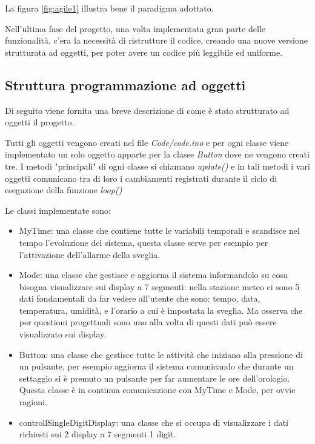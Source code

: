 \documentclass[paper=a4, fontsize=10pt]{scrartcl}
\begin{document}
La figura \ref{fig:agile1}
illustra bene il paradigma adottato.


Nell'ultima fase del progetto, una volta implementata gran parte delle funzionalità, c'era la necessità di ristrutture il codice, creando una nuove versione strutturata ad oggetti, per poter avere un codice più leggibile ed uniforme.
\subsection{Struttura programmazione ad oggetti}
Di seguito viene fornita una breve descrizione di come è stato strutturato ad oggetti il progetto.

Tutti gli oggetti vengono creati nel file \textit{Code/code.ino} e per ogni classe viene implementato un solo oggetto apparte per la classe \textit{Button} dove ne vengono creati tre. I metodi "principali" di ogni classe si chiamano \textit{update()} e in tali metodi i vari oggetti comunicano tra di loro i cambiamenti registrati durante il ciclo di eseguzione della funzione \textit{loop()}

Le classi implementate sono:

\begin{itemize}
\item MyTime: una classe che contiene tutte le variabili temporali e scandisce nel tempo l'evoluzione del sistema, questa classe serve per esempio per l'attivazione dell'allarme della sveglia.

\item Mode: una classe che gestisce e aggiorna il sistema informandolo su cosa bisogna visualizzare sui display a 7 segmenti: nella stazione meteo ci sono 5 dati fondamentali da far vedere all'utente che sono: tempo, data, temperatura, umidità, e l'orario a cui è impostata la sveglia. Ma osserva che per questioni progettuali sono uno alla volta di questi dati può essere visualizzato sui display.

\item Button: una classe che gestisce tutte le attività che iniziano alla pressione di un pulsante, per esempio aggiorna il sistema comunicando che durante un settaggio si è premuto un pulsante per far aumentare le ore dell'orologio. Questa classe è in continua comunicazione con MyTime e Mode, per ovvie ragioni.

\item controllSingleDigitDisplay: una classe che si occupa di visualizzare i dati richiesti sui 2 display a 7 segmenti 1 digit.
\end{itemize}
\end{document}
